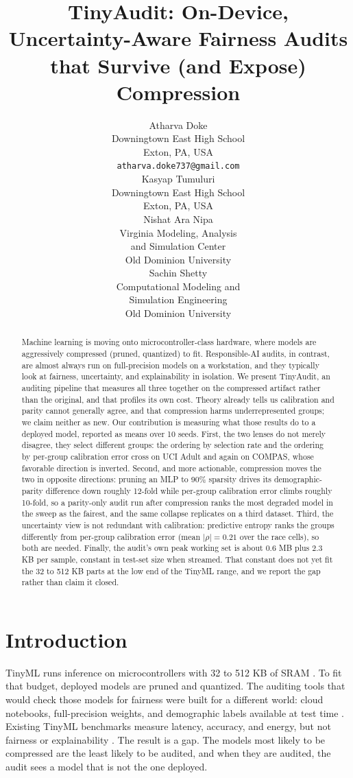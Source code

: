 \documentclass{article}
\title{TinyAudit: On-Device, Uncertainty-Aware Fairness Audits that Survive (and Expose) Compression}
\author{%
  Atharva Doke \\
  Downingtown East High School \\
  Exton, PA, USA \\
  \texttt{atharva.doke737@gmail.com} \\
  \And
  Kasyap Tumuluri \\
  Downingtown East High School \\
  Exton, PA, USA \\
  \AND
  Nishat Ara Nipa \\
  Virginia Modeling, Analysis \\ and Simulation Center \\
  Old Dominion University \\
  \And
  Sachin Shetty \\
  Computational Modeling and \\ Simulation Engineering \\
  Old Dominion University \\
}
\begin{document}
\maketitle

\begin{abstract}
Machine learning is moving onto microcontroller-class hardware, where models are aggressively compressed (pruned, quantized) to fit. Responsible-AI audits, in contrast, are almost always run on full-precision models on a workstation, and they typically look at fairness, uncertainty, and explainability in isolation. We present TinyAudit, an auditing pipeline that measures all three together on the compressed artifact rather than the original, and that profiles its own cost. Theory already tells us calibration and parity cannot generally agree, and that compression harms underrepresented groups; we claim neither as new. Our contribution is measuring what those results do to a deployed model, reported as means over 10 seeds. First, the two lenses do not merely disagree, they select different groups: the ordering by selection rate and the ordering by per-group calibration error cross on UCI Adult and again on COMPAS, whose favorable direction is inverted. Second, and more actionable, compression moves the two in opposite directions: pruning an MLP to 90\% sparsity drives its demographic-parity difference down roughly 12-fold while per-group calibration error climbs roughly 10-fold, so a parity-only audit run after compression ranks the most degraded model in the sweep as the fairest, and the same collapse replicates on a third dataset. Third, the uncertainty view is not redundant with calibration: predictive entropy ranks the groups differently from per-group calibration error (mean $|\rho| = 0.21$ over the race cells), so both are needed. Finally, the audit's own peak working set is about 0.6 MB plus 2.3 KB per sample, constant in test-set size when streamed. That constant does not yet fit the 32 to 512 KB parts at the low end of the TinyML range, and we report the gap rather than claim it closed.
\end{abstract}

\section{Introduction}

TinyML runs inference on microcontrollers with 32 to 512 KB of SRAM \cite{somvanshi2025}. To fit that budget, deployed models are pruned and quantized. The auditing tools that would check those models for fairness were built for a different world: cloud notebooks, full-precision weights, and demographic labels available at test time \cite{lee2021,deng2022,han2024}. Existing TinyML benchmarks measure latency, accuracy, and energy, but not fairness or explainability \cite{somvanshi2025}. The result is a gap. The models most likely to be compressed are the least likely to be audited, and when they are audited, the audit sees a model that is not the one deployed.
\end{document}

